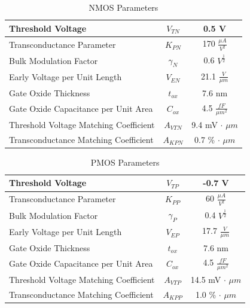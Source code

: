 \documentclass[12pt,oneside,final]{siuethesis}
\theoremstyle{definition}
\begin{document}
\begin{table} [htbp!]
\begin{center}
\begin{tabular}{| l | c | c |}
\hline 
Threshold Voltage & $V_{TN}$ & 0.5 V \\ 
\hline 
Transconductance Parameter & $K_{PN}$  &  170 $\frac{\mu A}{V^2}$ \\ 
\hline 
Bulk Modulation Factor & $\gamma_{N}$  &  0.6 $V^{\frac{1}{2}}$ \\ 
\hline 
Early Voltage per Unit Length & $V_{EN}$  &  21.1 $\frac{V}{\mu m}$ \\ 
\hline 
Gate Oxide Thickness & $t_{ox}$  &  7.6 nm \\ 
\hline 
Gate Oxide Capacitance per Unit Area & $C_{ox}$  & 4.5 $\frac{fF}{\mu m^2}$ \\ 
\hline 
Threshold Voltage Matching Coefficient & $A_{VTN}$  &  9.4 mV $\cdot$ $\mu m$ \\ 
\hline 
Transconductance Matching Coefficient & $A_{KPN}$  &  0.7 \% $\cdot$ $\mu m$ \\ 
\hline 
\end{tabular} 
\end{center}
\caption{NMOS Parameters}
\label{TBL:NMOS_PARMS}
\end{table}

 
\begin{table} [htbp!]
\begin{center}
\begin{tabular}{| l | c | c |}
\hline 
Threshold Voltage & $V_{TP}$ & -0.7 V \\ 
\hline 
Transconductance Parameter & $K_{PP}$  &  60 $\frac{\mu A}{V^2}$ \\ 
\hline 
Bulk Modulation Factor & $\gamma_{P}$  &  0.4 $V^{\frac{1}{2}}$ \\ 
\hline 
Early Voltage per Unit Length & $V_{EP}$  &  17.7 $\frac{V}{\mu m}$ \\ 
\hline 
Gate Oxide Thickness & $t_{ox}$  &  7.6 nm \\ 
\hline 
Gate Oxide Capacitance per Unit Area & $C_{ox}$  &  4.5 $\frac{fF}{\mu m^2}$ \\ 
\hline 
Threshold Voltage Matching Coefficient & $A_{VTP}$  &  14.5 mV $\cdot$ $\mu m$ \\ 
\hline 
Transconductance Matching Coefficient & $A_{KPP}$  &  1.0 \% $\cdot$ $\mu m$ \\ 
\hline 
\end{tabular} 
\end{center}
\caption{PMOS Parameters}
\label{TBL:PMOS_PARMS}
\end{table}
\end{document}
